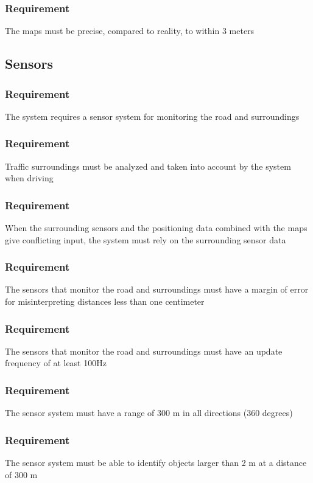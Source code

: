 \documentclass{article}
\begin{document}
{      \subsubsection{Requirement}
\hfill \break 
\- \- \-The maps must be precise, compared to reality, to within 3 meters
  \subsection{Sensors}
      \subsubsection{Requirement}
\hfill \break 
\- \- \-The system requires a sensor system for monitoring the road and surroundings
      \subsubsection{Requirement}
\hfill \break 
\- \- \-Traffic surroundings must be analyzed and taken into account by the system when driving
      \subsubsection{Requirement}
\hfill \break 
\- \- \-When the surrounding sensors and the positioning data combined with the maps give conflicting input, the system must rely on the surrounding sensor data
      \subsubsection{Requirement}
\hfill \break 
\- \- \-The sensors that monitor the road and surroundings must have a margin of error for misinterpreting distances less than one centimeter
      \subsubsection{Requirement}
\hfill \break 
\- \- \-The sensors that monitor the road and surroundings must have an update frequency of at least 100Hz
      \subsubsection{Requirement}
\hfill \break 
\- \- \-The sensor system must have a range of 300 m in all directions (360 degrees)
      \subsubsection{Requirement}
\hfill \break 
\- \- \-The sensor system must be able to identify objects larger than 2 m at a distance of 300 m

}
\end{document}
